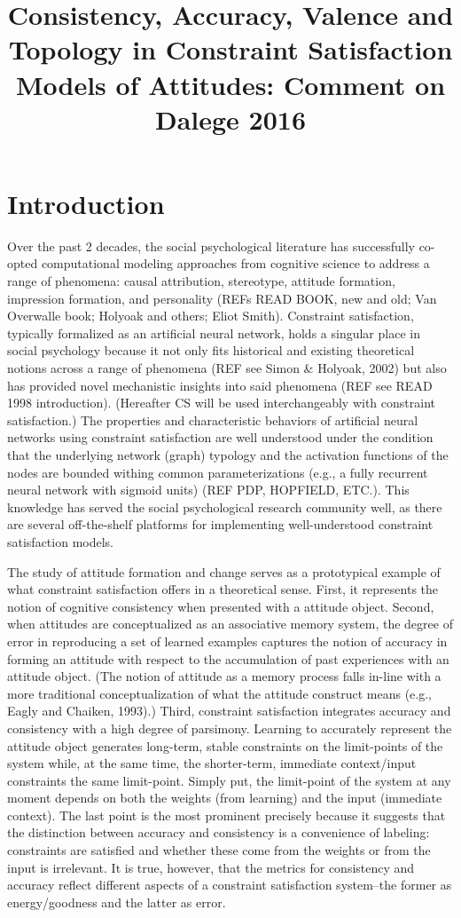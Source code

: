 \documentclass{article}
\title{Consistency, Accuracy, Valence and Topology in Constraint Satisfaction Models of Attitudes: Comment on Dalege 2016}
\begin{document}
\maketitle

\section{Introduction}
Over the past 2 decades, the social psychological literature has successfully co-opted computational modeling approaches from cognitive science to address a range of phenomena:  causal attribution, stereotype, attitude formation, impression formation, and personality (REFs READ BOOK, new and old; Van Overwalle book; Holyoak and others; Eliot Smith).  Constraint satisfaction, typically formalized as an artificial neural network, holds a singular place in social psychology because it not only fits historical and existing theoretical notions across a range of phenomena (REF see Simon \& Holyoak, 2002) but also has provided novel mechanistic insights into said phenomena (REF see READ 1998 introduction). (Hereafter CS will be used interchangeably with constraint satisfaction.) The properties and characteristic behaviors of artificial neural networks using constraint satisfaction are well understood under the condition that the underlying network (graph) typology and the activation functions of the nodes are bounded withing common parameterizations (e.g., a fully recurrent neural network with sigmoid units) (REF PDP, HOPFIELD, ETC.). This knowledge has served the social psychological research community well, as there are several off-the-shelf platforms for implementing well-understood constraint satisfaction models.

The study of attitude formation and change serves as a prototypical example of what constraint satisfaction offers in a theoretical sense.  First, it represents the notion of cognitive consistency when presented with a attitude object.  Second, when attitudes are conceptualized as an associative memory system, the degree of error in reproducing a set of learned examples captures the notion of accuracy in forming an attitude with respect to the accumulation of past experiences with an attitude object. (The notion of attitude as a memory process falls in-line with a more traditional conceptualization of what the attitude construct means (e.g., Eagly and Chaiken, 1993).) Third, constraint satisfaction integrates accuracy and consistency with a high degree of parsimony. Learning to accurately represent the attitude object generates long-term, stable constraints on the limit-points of the system while, at the same time,  the shorter-term, immediate context/input constraints the same limit-point.  Simply put, the limit-point of the system at any moment depends on both the weights (from learning) and the input (immediate context).  The last point is the most prominent precisely because it suggests that the distinction between accuracy and consistency is a convenience of labeling:  constraints are satisfied and whether these come from the weights or from the input is irrelevant.  It is true, however, that the metrics for consistency and accuracy reflect different aspects of a constraint satisfaction system--the former as energy/goodness and the latter as error.
\end{document}
